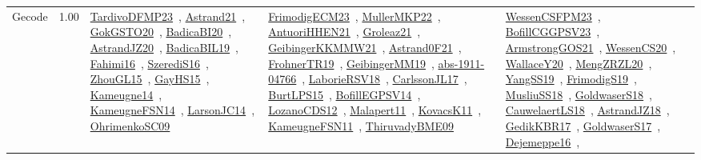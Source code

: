 {\begin{longtable}{p{3cm}r>{\raggedright\arraybackslash}p{6cm}>{\raggedright\arraybackslash}p{6cm}>{\raggedright\arraybackslash}p{8cm}}
\index{Gecode}\index{CPSystems!Gecode}Gecode &  1.00 & \href{../works/TardivoDFMP23.pdf}{TardivoDFMP23}~\cite{TardivoDFMP23}, \href{../works/Astrand21.pdf}{Astrand21}~\cite{Astrand21}, \href{../works/GokGSTO20.pdf}{GokGSTO20}~\cite{GokGSTO20}, \href{../works/BadicaBI20.pdf}{BadicaBI20}~\cite{BadicaBI20}, \href{../works/AstrandJZ20.pdf}{AstrandJZ20}~\cite{AstrandJZ20}, \href{../works/BadicaBIL19.pdf}{BadicaBIL19}~\cite{BadicaBIL19}, \href{../works/Fahimi16.pdf}{Fahimi16}~\cite{Fahimi16}, \href{../works/SzerediS16.pdf}{SzerediS16}~\cite{SzerediS16}, \href{../works/ZhouGL15.pdf}{ZhouGL15}~\cite{ZhouGL15}, \href{../works/GayHS15.pdf}{GayHS15}~\cite{GayHS15}, \href{../works/Kameugne14.pdf}{Kameugne14}~\cite{Kameugne14}, \href{../works/KameugneFSN14.pdf}{KameugneFSN14}~\cite{KameugneFSN14}, \href{../works/LarsonJC14.pdf}{LarsonJC14}~\cite{LarsonJC14}, \href{../works/OhrimenkoSC09.pdf}{OhrimenkoSC09}~\cite{OhrimenkoSC09} & \href{../works/FrimodigECM23.pdf}{FrimodigECM23}~\cite{FrimodigECM23}, \href{../works/MullerMKP22.pdf}{MullerMKP22}~\cite{MullerMKP22}, \href{../works/AntuoriHHEN21.pdf}{AntuoriHHEN21}~\cite{AntuoriHHEN21}, \href{../works/Groleaz21.pdf}{Groleaz21}~\cite{Groleaz21}, \href{../works/GeibingerKKMMW21.pdf}{GeibingerKKMMW21}~\cite{GeibingerKKMMW21}, \href{../works/Astrand0F21.pdf}{Astrand0F21}~\cite{Astrand0F21}, \href{../works/FrohnerTR19.pdf}{FrohnerTR19}~\cite{FrohnerTR19}, \href{../works/GeibingerMM19.pdf}{GeibingerMM19}~\cite{GeibingerMM19}, \href{../works/abs-1911-04766.pdf}{abs-1911-04766}~\cite{abs-1911-04766}, \href{../works/LaborieRSV18.pdf}{LaborieRSV18}~\cite{LaborieRSV18}, \href{../works/CarlssonJL17.pdf}{CarlssonJL17}~\cite{CarlssonJL17}, \href{../works/BurtLPS15.pdf}{BurtLPS15}~\cite{BurtLPS15}, \href{../works/BofillEGPSV14.pdf}{BofillEGPSV14}~\cite{BofillEGPSV14}, \href{../works/LozanoCDS12.pdf}{LozanoCDS12}~\cite{LozanoCDS12}, \href{../works/Malapert11.pdf}{Malapert11}~\cite{Malapert11}, \href{../works/KovacsK11.pdf}{KovacsK11}~\cite{KovacsK11}, \href{../works/KameugneFSN11.pdf}{KameugneFSN11}~\cite{KameugneFSN11}, \href{../works/ThiruvadyBME09.pdf}{ThiruvadyBME09}~\cite{ThiruvadyBME09} & \href{../works/WessenCSFPM23.pdf}{WessenCSFPM23}~\cite{WessenCSFPM23}, \href{../works/BofillCGGPSV23.pdf}{BofillCGGPSV23}~\cite{BofillCGGPSV23}, \href{../works/ArmstrongGOS21.pdf}{ArmstrongGOS21}~\cite{ArmstrongGOS21}, \href{../works/WessenCS20.pdf}{WessenCS20}~\cite{WessenCS20}, \href{../works/WallaceY20.pdf}{WallaceY20}~\cite{WallaceY20}, \href{../works/MengZRZL20.pdf}{MengZRZL20}~\cite{MengZRZL20}, \href{../works/YangSS19.pdf}{YangSS19}~\cite{YangSS19}, \href{../works/FrimodigS19.pdf}{FrimodigS19}~\cite{FrimodigS19}, \href{../works/MusliuSS18.pdf}{MusliuSS18}~\cite{MusliuSS18}, \href{../works/GoldwaserS18.pdf}{GoldwaserS18}~\cite{GoldwaserS18}, \href{../works/CauwelaertLS18.pdf}{CauwelaertLS18}~\cite{CauwelaertLS18}, \href{../works/AstrandJZ18.pdf}{AstrandJZ18}~\cite{AstrandJZ18}, \href{../works/GedikKBR17.pdf}{GedikKBR17}~\cite{GedikKBR17}, \href{../works/GoldwaserS17.pdf}{GoldwaserS17}~\cite{GoldwaserS17}, \href{../works/Dejemeppe16.pdf}{Dejemeppe16}~\cite{Dejemeppe16}, 
\end{longtable}}
